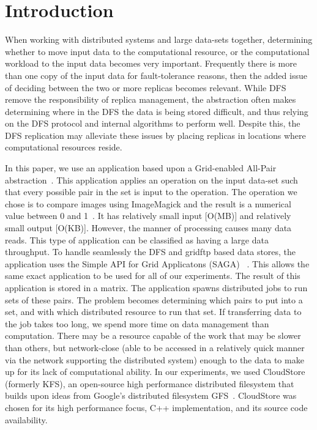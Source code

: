 \documentclass[a4paper,11pt]{article}
\newcommand{\jhanote}[1]{ {\textcolor{red} { ***Jha: #1 }}}
\newcommand{\jhanote}[1]{}
\begin{document}
\section{Introduction}
When working with distributed systems and large data-sets together, determining whether to move input data to the computational resource, or the computational workload to the input data becomes very important. Frequently there is more than one copy of the input data for fault-tolerance reasons, then the added issue of deciding between the two or more replicas becomes relevant. While DFS remove the responsibility of replica management, the abstraction often makes determining where in the DFS the data is being stored difficult, and thus relying on the DFS protocol and internal algorithms to perform well. Despite this, the DFS replication may alleviate these issues by placing replicas in locations where computational resources reside.


In this paper, we use an application based upon a Grid-enabled All-Pair abstraction~\cite{Interop, AllPairs}. This application applies an operation on the input data-set such that every possible pair in the set is input to the operation. The operation we chose is to compare images using ImageMagick and the result is a numerical value between 0 and 1~\cite{imagemagick}. It has relatively small input [O(MB)] and relatively small output [O(KB)]. However, the manner of processing causes many data reads. This type of application can be classified as having a large data throughput. To handle seamlessly the DFS and gridftp based data stores, the application uses the Simple API for Grid Applicatons (SAGA) ~\cite{saga_web}. This allows the same exact application to be used for all of our experiments. The result of this application is stored in a matrix. The application spawns distributed jobs to run sets of these pairs. The problem becomes determining which pairs to put into a set, and with which distributed resource to run that set. If transferring data to the job takes too long, we spend more time on data management than computation. There may be a resource capable of the work that may be slower than others, but network-close (able to be accessed in a relatively quick manner via the network supporting the distributed system) enough to the data to make up for its lack of computational ability. In our experiments, we used CloudStore (formerly KFS), an open-source high performance distributed filesystem that builds upon ideas from Google's distributed filesystem GFS~\cite{kfs_web}. CloudStore was chosen for its high performance focus, C++ implementation, and its source code availability.
\end{document}
